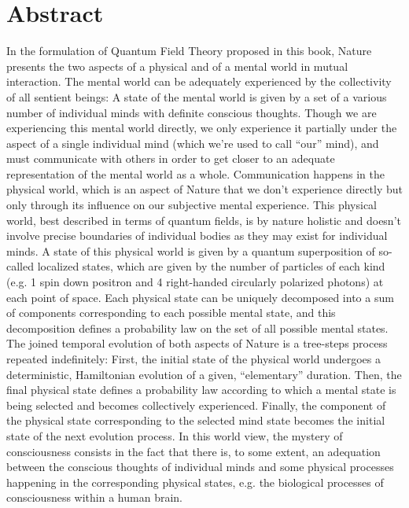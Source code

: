\documentclass[10pt,a4paper,twoside,openany]{book}
\begin{document}

\section*{Abstract}

In the formulation of Quantum Field Theory proposed in this book, Nature presents the two aspects of a physical and of a mental world in mutual interaction. The mental world can be adequately experienced by the collectivity of all sentient beings: A state of the mental world is given by a set of a various number of individual minds with definite conscious thoughts. Though we are experiencing this mental world directly, we only experience it partially under the aspect of a single individual mind (which we're used to call ``our'' mind), and must communicate with others in order to get closer to an adequate representation of the mental world as a whole. Communication happens in the physical world, which is an aspect of Nature that we don't experience directly but only through its influence on our subjective mental experience. This physical world, best described in terms of quantum fields, is by nature holistic and doesn't involve precise boundaries of individual bodies as they may exist for individual minds. A state of this physical world is given by a quantum superposition of so-called localized states, which are given by the number of particles of each kind (e.g. 1 spin down positron and 4 right-handed circularly polarized photons) at each point of space. Each physical state can be uniquely decomposed into a sum of components corresponding to each possible mental state, and this decomposition defines a probability law on the set of all possible mental states. The joined temporal evolution of both aspects of Nature is a tree-steps process repeated indefinitely: First, the initial state of the physical world undergoes a deterministic, Hamiltonian evolution of a given, ``elementary'' duration. Then, the final physical state defines a probability law according to which a mental state is being selected and becomes collectively experienced. Finally, the component of the physical state corresponding to the selected mind state becomes the initial state of the next evolution process. In this world view, the mystery of consciousness consists in the fact that there is, to some extent, an adequation between the conscious thoughts of individual minds and some physical processes happening in the corresponding physical states, e.g. the biological processes of consciousness within a human brain.
\end{document}
